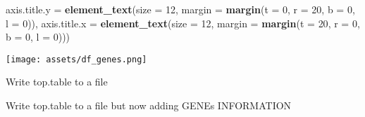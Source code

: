 \documentclass[
]{article}
\newenvironment{Shaded}{\begin{snugshade}}{\end{snugshade}}
\newcommand{\AttributeTok}[1]{\textcolor[rgb]{0.13,0.29,0.53}{#1}}
\newcommand{\DecValTok}[1]{\textcolor[rgb]{0.00,0.00,0.81}{#1}}
\newcommand{\FunctionTok}[1]{\textcolor[rgb]{0.13,0.29,0.53}{\textbf{#1}}}
\newcommand{\NormalTok}[1]{#1}
\newcommand{\OtherTok}[1]{\textcolor[rgb]{0.56,0.35,0.01}{#1}}
\newcommand{\SpecialCharTok}[1]{\textcolor[rgb]{0.81,0.36,0.00}{\textbf{#1}}}
\newcommand{\StringTok}[1]{\textcolor[rgb]{0.31,0.60,0.02}{#1}}
\begin{document}
\begin{Shaded}
\begin{Highlighting}[]
        \AttributeTok{axis.title.y     =} \FunctionTok{element\_text}\NormalTok{(}\AttributeTok{size =} \DecValTok{12}\NormalTok{, }\AttributeTok{margin =} \FunctionTok{margin}\NormalTok{(}\AttributeTok{t =} \DecValTok{0}\NormalTok{, }\AttributeTok{r =} \DecValTok{20}\NormalTok{, }\AttributeTok{b =} \DecValTok{0}\NormalTok{, }\AttributeTok{l =} \DecValTok{0}\NormalTok{)),}
        \AttributeTok{axis.title.x     =} \FunctionTok{element\_text}\NormalTok{(}\AttributeTok{size =} \DecValTok{12}\NormalTok{, }\AttributeTok{margin =} \FunctionTok{margin}\NormalTok{(}\AttributeTok{t =} \DecValTok{20}\NormalTok{, }\AttributeTok{r =} \DecValTok{0}\NormalTok{, }\AttributeTok{b =} \DecValTok{0}\NormalTok{, }\AttributeTok{l =} \DecValTok{0}\NormalTok{)))}
\end{Highlighting}
\end{Shaded}

\texttt{[image: assets/df\_genes.png]}

Write top.table to a file

\begin{Shaded}
\end{Shaded}

Write top.table to a file but now adding GENEs INFORMATION
\end{document}
